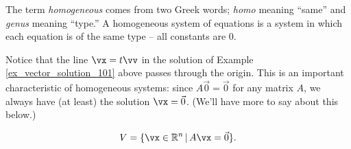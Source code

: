 \smallskip

The term \textit{homogeneous} comes from two Greek words; \textit{homo} meaning ``same'' and \textit{genus} meaning ``type.'' A homogeneous system of equations is a system in which each equation is of the same type -- all constants are 0. 

Notice that the line $\vx =t\vv$ in the solution of Example \ref{ex_vector_solution_101} above passes through the origin. This is an important characteristic of homogeneous systems: since $A\vec 0 = \vec 0$ for any matrix $A$, we always have (at least) the solution $\vx = \vec 0$. (We'll have more to say about this below.)

\[
V = \{\vx\in\R^n \, | \, A\vx = \vec 0\}.
\]


\medskip

